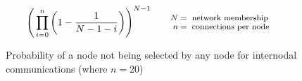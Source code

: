 \begin{equation} \label{eq:internodalconnections}
\Bigg(\prod_{i=0}^{n}\bigg(1 - \frac{1}{N-1-i}\bigg)\Bigg)^{N-1}
\qquad\parbox{4.0cm}{\footnotesize$\begin{aligned} N &= \text{ network membership}\\[-1.0ex] n &= \text{ connections per node}\end{aligned}$}
\end{equation}

\begin{figure}[h!]
	\begin{center}
		\caption{Probability of a node not being selected by any node for internodal communications (where $n=20$)}
		\label{fig:internodalconnections}
	\end{center}
\end{figure}